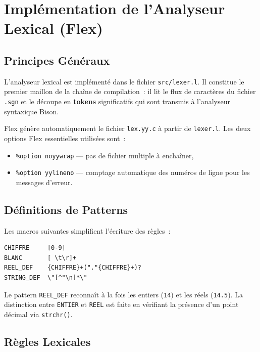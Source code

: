 \documentclass[a4paper,12pt]{article}
\begin{document}
\section{Implémentation de l'Analyseur Lexical (Flex)}

\subsection{Principes Généraux}

L'analyseur lexical est implémenté dans le fichier \texttt{src/lexer.l}. Il constitue le premier maillon de la chaîne de compilation~: il lit le flux de caractères du fichier \texttt{.sgn} et le découpe en \textbf{tokens} significatifs qui sont transmis à l'analyseur syntaxique Bison.

Flex génère automatiquement le fichier \texttt{lex.yy.c} à partir de \texttt{lexer.l}. Les deux options Flex essentielles utilisées sont~:
\begin{itemize}[leftmargin=1.5em]
  \item \texttt{\%option noyywrap} — pas de fichier multiple à enchaîner,
  \item \texttt{\%option yylineno} — comptage automatique des numéros de ligne pour les messages d'erreur.
\end{itemize}

\subsection{Définitions de Patterns}

Les macros suivantes simplifient l'écriture des règles~:

\begin{lstlisting}[caption={Macros de patterns dans lexer.l}, style=flex, label=lst:macros]
CHIFFRE     [0-9]
BLANC       [ \t\r]+
REEL_DEF    {CHIFFRE}+("."{CHIFFRE}+)?
STRING_DEF  \"[^"\n]*\"
\end{lstlisting}

Le pattern \texttt{REEL\_DEF} reconnaît à la fois les entiers (\texttt{14}) et les réels (\texttt{14.5}). La distinction entre \texttt{ENTIER} et \texttt{REEL} est faite en vérifiant la présence d'un point décimal via \texttt{strchr()}.

\subsection{Règles Lexicales}
\end{document}
